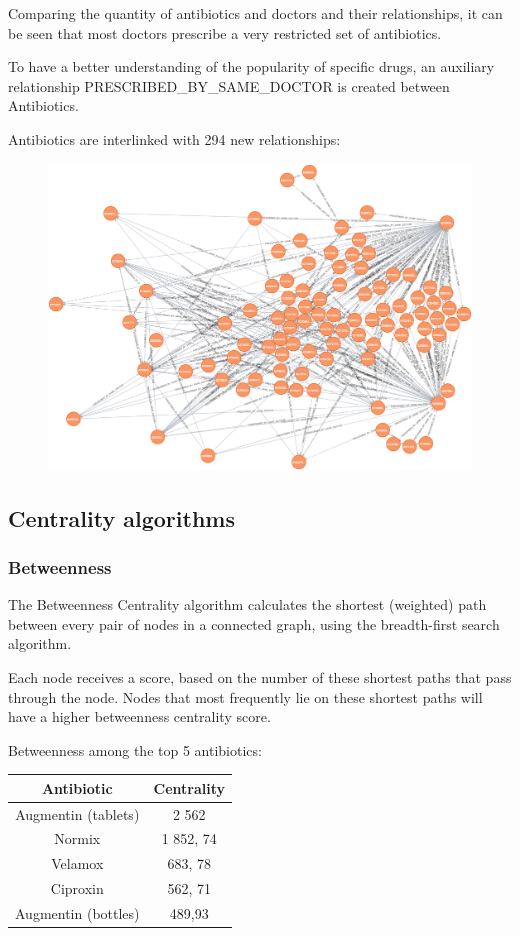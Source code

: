 Comparing the quantity of antibiotics and doctors and their relationships, it can be seen that most doctors prescribe a very restricted set of antibiotics.

To have a better understanding of the popularity of specific drugs, an auxiliary relationship PRESCRIBED\_BY\_SAME\_DOCTOR is created between Antibiotics. 

Antibiotics are interlinked with 294 new relationships:

\begin{figure}[h]
	\centering
	\includegraphics[scale=0.3]{./images/antibiotics-graph.png}
\end{figure}

\subsection{Centrality algorithms}

\subsubsection{Betweenness}
The Betweenness Centrality algorithm calculates the shortest (weighted) path between every pair of nodes in a connected graph, using the breadth-first search algorithm. 

Each node receives a score, based on the number of these shortest paths that pass through the node. Nodes that most frequently lie on these shortest paths will have a higher betweenness centrality score. 

Betweenness among the top 5 antibiotics:
\begin{center}
	\begin{tabular}{c|c}
		Antibiotic & Centrality \\
		\hline
		Augmentin (tablets) & 2 562 \\
		\hline
		Normix & 1 852, 74 \\
		\hline
		Velamox & 683, 78 \\
		\hline
		Ciproxin & 562, 71 \\
		\hline
		Augmentin (bottles) & 489,93 \\
	\end{tabular}
\end{center}

